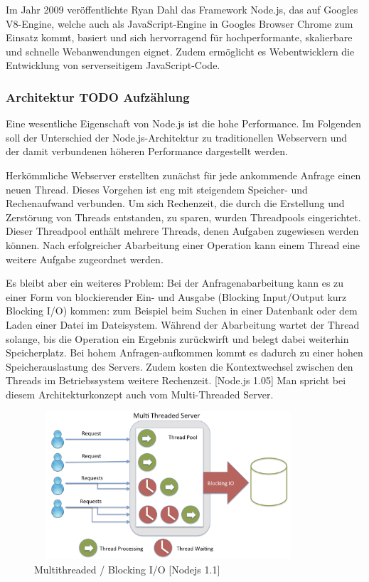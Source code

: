 Im Jahr 2009 veröffentlichte Ryan Dahl das Framework Node.js, das auf Googles V8-Engine, welche auch als JavaScript-Engine in Googles Browser Chrome zum Einsatz kommt, basiert und sich hervorragend für hochperformante, skalierbare und schnelle Webanwendungen eignet. Zudem ermöglicht es Webentwicklern die Entwicklung von serverseitigem JavaScript-Code. \-[NodeJS 1.0]


\subsubsection{Architektur TODO Aufzählung}
Eine wesentliche Eigenschaft von Node.js ist die hohe Performance. Im Folgenden soll der Unterschied der Node.js-Architektur zu traditionellen Webservern und der damit verbundenen höheren Performance dargestellt werden.
\newline

Herkömmliche Webserver erstellten zunächst für jede ankommende Anfrage einen neuen Thread. Dieses Vorgehen ist eng mit steigendem Speicher- und Rechenaufwand verbunden. Um sich Rechenzeit, die durch die Erstellung und Zerstörung von Threads entstanden, zu sparen, wurden Threadpools eingerichtet. Dieser Threadpool enthält mehrere Threads, denen Aufgaben zugewiesen werden können. Nach erfolgreicher Abarbeitung einer Operation kann einem Thread eine weitere Aufgabe zugeordnet werden.
\newline

Es bleibt aber ein weiteres Problem: Bei der Anfragenabarbeitung kann es zu einer Form von blockierender Ein- und Ausgabe (Blocking Input/Output kurz Blocking I/O) kommen: zum Beispiel beim Suchen in einer Datenbank oder dem Laden einer Datei im Dateisystem. Während der Abarbeitung wartet der Thread solange, bis die Operation ein Ergebnis zurückwirft und belegt dabei weiterhin Speicherplatz. Bei hohem Anfragen-aufkommen kommt es dadurch zu einer hohen Speicherauslastung des Servers. Zudem kosten die Kontextwechsel zwischen den Threads im Betriebssystem weitere Rechenzeit. [Node.js 1.05] Man spricht bei diesem Architekturkonzept auch vom Multi-Threaded Server.
\newline

\begin{figure}[h]
\centering
\includegraphics[width=10cm, height = 5.5cm]{images/nodejs_otherthreading.png}
\caption{Multithreaded / Blocking I/O [Nodejs 1.1]}
\end{figure}
 
